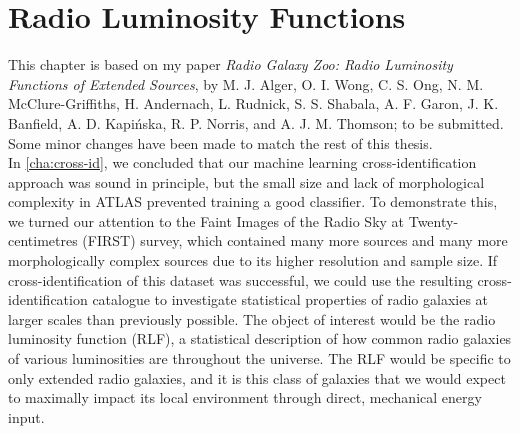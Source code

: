 \chapter{Radio Luminosity Functions}
\label{cha:rlfs}





This chapter is based on my paper \emph{Radio Galaxy Zoo: Radio Luminosity Functions of Extended Sources}, by M. J. Alger, O. I. Wong, C. S. Ong, N. M. McClure-Griffiths, H. Andernach, L. Rudnick, S. S. Shabala, A. F. Garon, J. K. Banfield, A. D. Kapi\'nska, R. P. Norris, and A. J. M. Thomson; to be submitted. Some minor changes have been made to match the rest of this thesis.\\

In \autoref{cha:cross-id}, we concluded that our machine learning cross-identification approach was sound in principle, but the small size and lack of morphological complexity in ATLAS prevented training a good classifier. To demonstrate this, we turned our attention to the Faint Images of the Radio Sky at Twenty-centimetres (FIRST) survey, which contained many more sources and many more morphologically complex sources due to its higher resolution and sample size. If cross-identification of this dataset was successful, we could use the resulting cross-identification catalogue to investigate statistical properties of radio galaxies at larger scales than previously possible. The object of interest would be the radio luminosity function (RLF), a statistical description of how common radio galaxies of various luminosities are throughout the universe. The RLF would be specific to only extended radio galaxies, and it is this class of galaxies that we would expect to maximally impact its local environment through direct, mechanical energy input.

